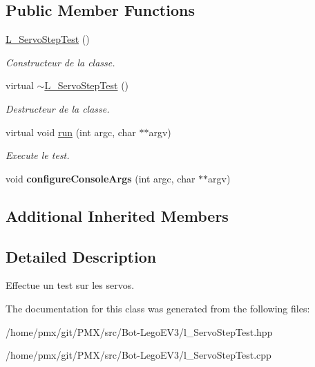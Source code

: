 \subsection*{Public Member Functions}
\begin{DoxyCompactItemize}
\item 
\mbox{\label{classL__ServoStepTest_a5391734cdca1506d54b6338dbeaf0c3f}} 
\hyperlink{classL__ServoStepTest_a5391734cdca1506d54b6338dbeaf0c3f}{L\+\_\+\+Servo\+Step\+Test} ()
\begin{DoxyCompactList}\small\item\em Constructeur de la classe. \end{DoxyCompactList}\item 
\mbox{\label{classL__ServoStepTest_af8b73eb2c56d2a07ff978a27d5675be0}} 
virtual \hyperlink{classL__ServoStepTest_af8b73eb2c56d2a07ff978a27d5675be0}{$\sim$\+L\+\_\+\+Servo\+Step\+Test} ()
\begin{DoxyCompactList}\small\item\em Destructeur de la classe. \end{DoxyCompactList}\item 
\mbox{\label{classL__ServoStepTest_a34bf11a5d95b6a2efdecefee16f7235e}} 
virtual void \hyperlink{classL__ServoStepTest_a34bf11a5d95b6a2efdecefee16f7235e}{run} (int argc, char $\ast$$\ast$argv)
\begin{DoxyCompactList}\small\item\em Execute le test. \end{DoxyCompactList}\item 
\mbox{\label{classL__ServoStepTest_a267c04ae00b52e767a3274b128a0e68b}} 
void {\bfseries configure\+Console\+Args} (int argc, char $\ast$$\ast$argv)
\end{DoxyCompactItemize}
\subsection*{Additional Inherited Members}


\subsection{Detailed Description}
Effectue un test sur les servos. 

The documentation for this class was generated from the following files\+:\begin{DoxyCompactItemize}
\item 
/home/pmx/git/\+P\+M\+X/src/\+Bot-\/\+Lego\+E\+V3/l\+\_\+\+Servo\+Step\+Test.\+hpp\item 
/home/pmx/git/\+P\+M\+X/src/\+Bot-\/\+Lego\+E\+V3/l\+\_\+\+Servo\+Step\+Test.\+cpp\end{DoxyCompactItemize}

